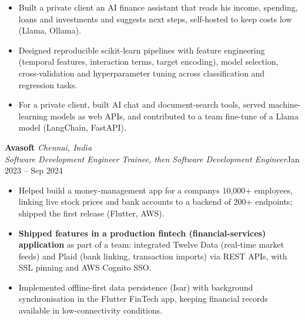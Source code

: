 \documentclass[a4paper,11pt]{article}
\newcommand{\role}[4]{%
  \textbf{#1}{\color{muted}\,\textperiodcentered\,\textit{#2}}\\
  \textit{#4}\hfill{\color{muted}#3}\par}
\newcommand{\gap}{\vspace{5pt}}
\newcommand{\num}[1]{\textbf{#1}}   %
\begin{document}
\begin{itemize}
  \item Built a private client an AI finance assistant that reads his income, spending, loans and investments and suggests next steps, self-hosted to keep costs low (Llama, Ollama).
  \item Designed reproducible scikit-learn pipelines with feature engineering (temporal features, interaction terms, target encoding), model selection, cross-validation and hyperparameter tuning across classification and regression tasks.
  \item For a private client, built AI chat and document-search tools, served machine-learning models as web APIs, and contributed to a team fine-tune of a Llama model (LangChain, FastAPI).
\end{itemize}
\gap
{}
\role{Avasoft}{Chennai, India}{Jan 2023 – Sep 2024}{Software Development Engineer Trainee, then Software Development Engineer}
\begin{itemize}
  \item Helped build a money-management app for a company\textquotesingle{}s 10,000+ employees, linking live stock prices and bank accounts to a backend of 200+ endpoints; shipped the first release (Flutter, AWS).
  \item \num{Shipped features in a production fintech (financial-services) application} as part of a team: integrated Twelve Data (real-time market feeds) and Plaid (bank linking, transaction imports) via REST APIs, with SSL pinning and AWS Cognito SSO.
  \item Implemented offline-first data persistence (Isar) with background synchronisation in the Flutter FinTech app, keeping financial records available in low-connectivity conditions.
\end{itemize}
\end{document}
